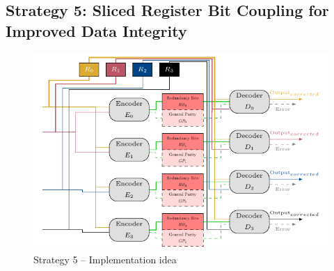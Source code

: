 \subsection{Strategy 5: Sliced Register Bit Coupling for Improved Data Integrity}

\begin{figure}[ht]
    \centering
    \includegraphics[page=1]{c6_group_composition/img/implem5_spaghetti.pdf}
    \caption{Strategy 5 -- Implementation idea}
    \label{fig:strategy_5_functionning}
\end{figure}

